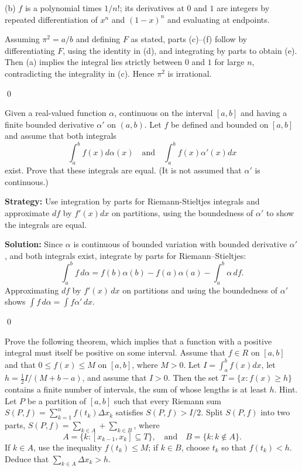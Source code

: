 (b) $f$ is a polynomial times $1/n!$; its derivatives at $0$ and $1$ are integers by repeated differentiation of $x^n$ and $(1-x)^n$ and evaluating at endpoints.

Assuming $\pi^2=a/b$ and defining $F$ as stated, parts (c)–(f) follow by differentiating $F$, using the identity in (d), and integrating by parts to obtain (e). Then (a) implies the integral lies strictly between $0$ and $1$ for large $n$, contradicting the integrality in (c). Hence $\pi^2$ is irrational.




\qed
\begin{problembox}
Given a real-valued function $\alpha$, continuous on the interval $[a, b]$ and having a finite bounded derivative $\alpha'$ on $(a, b)$. Let $f$ be defined and bounded on $[a, b]$ and assume that both integrals
\[\int_{a}^{b} f(x) d\alpha(x) \quad \text{and} \quad \int_{a}^{b} f(x) \alpha'(x) dx\]
exist. Prove that these integrals are equal. (It is not assumed that $\alpha'$ is continuous.)
\end{problembox}

\noindent\textbf{Strategy:} Use integration by parts for Riemann-Stieltjes integrals and approximate $df$ by $f'(x) dx$ on partitions, using the boundedness of $\alpha'$ to show the integrals are equal.

\bigskip\noindent\textbf{Solution:}
Since $\alpha$ is continuous of bounded variation with bounded derivative $\alpha'$, and both integrals exist, integrate by parts for Riemann–Stieltjes:
\[\int_a^b f\,d\alpha = f(b)\alpha(b)-f(a)\alpha(a)-\int_a^b \alpha\,df.
\]
Approximating $df$ by $f'(x)\,dx$ on partitions and using the boundedness of $\alpha'$ shows $\int f\,d\alpha=\int f\alpha'\,dx$.




\qed
\begin{problembox}
Prove the following theorem, which implies that a function with a positive integral must itself be positive on some interval. Assume that $f \in R$ on $[a, b]$ and that $0 \leq f(x) \leq M$ on $[a, b]$, where $M > 0$. Let $I = \int_{a}^{b} f(x) dx$, let $h = \frac{1}{2} I/(M + b - a)$, and assume that $I > 0$. Then the set $T = \{ x : f(x) \geq h \}$ contains a finite number of intervals, the sum of whose lengths is at least $h$. Hint. Let $P$ be a partition of $[a, b]$ such that every Riemann sum $S(P, f) = \sum_{k=1}^{n} f(t_k) \Delta x_k$ satisfies $S(P, f) > I/2$. Split $S(P, f)$ into two parts, $S(P, f) = \sum_{k \in A} + \sum_{k \in B}$, where
\[A = \{ k : [x_{k-1}, x_k] \subseteq T \}, \quad \text{and} \quad B = \{ k : k \notin A \}.\]
If $k \in A$, use the inequality $f(t_k) \leq M$; if $k \in B$, choose $t_k$ so that $f(t_k) < h$. Deduce that $\sum_{k \in A} \Delta x_k > h$.
\end{problembox}

